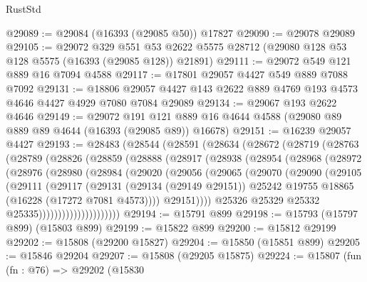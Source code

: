 \begin{lexlean}{RustStd}
\begin{coremodule}
@29089 := @29084 (@16393 (@29085 @50)) @17827
@29090 := @29078 @29089
@29105 := @29072
    @329
    @551
    @53
    @2622
    @5575
    @28712
    (@29080 @128 @53 @128 @5575 (@16393 (@29085 @128)) @21891)
@29111 := @29072 @549 @121 @889 @16 @7094 @4588
@29117 := @17801 @29057 @4427 @549 @889 @7088 @7092
@29131 := @18806 @29057 @4427 @143 @2622 @889 @4769 @193 @4573 @4646 @4427 @4929 @7080 @7084 @29089
@29134 := @29067 @193 @2622 @4646
@29149 := @29072
    @191
    @121
    @889
    @16
    @4644
    @4588
    (@29080 @89 @889 @89 @4644 (@16393 (@29085 @89)) @16678)
@29151 := @16239 @29057 @4427
@29193 := @28483
    (@28544
      (@28591
        (@28634
          (@28672
            (@28719
              (@28763
                (@28789
                  (@28826
                    (@28859
                      (@28888
                        (@28917
                          (@28938
                            (@28954
                              (@28968
                                (@28972
                                  (@28976
                                    (@28980
                                      (@28984
                                        (@29020
                                          (@29056
                                            (@29065
                                              (@29070
                                                (@29090
                                                  (@29105
                                                    (@29111
                                                      (@29117
                                                        (@29131
                                                          (@29134 (@29149 @29151))
                                                          @25242
                                                          @19755
                                                          @18865
                                                          (@16228 (@17272 @7081 @4573))))
                                                      @29151))))
                                              @25326
                                              @25329
                                              @25332
                                              @25335)))))))))))))))))))))
@29194 := @15791 @899
@29198 := @15793 (@15797 @899) (@15803 @899)
@29199 := @15822 @899
@29200 := @15812 @29199
@29202 := @15808 (@29200 @15827)
@29204 := @15850 (@15851 @899)
@29205 := @15846 @29204
@29207 := @15808 (@29205 @15875)
@29224 := @15807
    (fun (fn : @76) =>
    @29202
      (@15830

\end{coremodule}
\end{lexlean}
